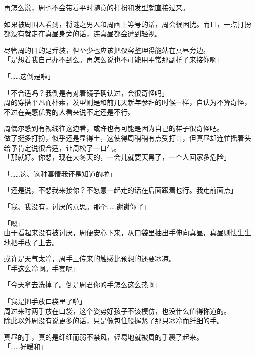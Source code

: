 再怎么说，周也不会带着平时随意的打扮和发型就直接过来。

如果被周围人看到，将谜之男人和周画上等号的话，周会很困扰。而且，一点打扮都没有就走在真昼身旁的话，连真昼都会遭到轻视。

尽管周的目的是乔装，但至少也应该把仪容整理得能站在真昼旁边。\\

「是想着我自己办不到么。再怎么说也不可能用平常那副样子来接你啊」

「……这倒是啦」

「不合适吗？我倒是有对着镜子确认过，会很奇怪吗」\\

周的穿搭平凡而朴素，发型则是和前几天新年参拜的时候一样，自认为不算奇怪，不过在美感优秀的人看来说不定还是不行。

周偶尔感到有视线往这边看，或许也有可能是因为自己的样子很奇怪吧。\\

做了挺多打扮，似乎还是显得土，这使得周稍稍有点受打击，但真昼却连忙摇着头给予肯定说很合适，让周松了一口气。\\

「那就好。你想，现在大冬天的，一会儿就要天黑了，一个人回家多危险」

「……这、这种事情我还是知道的啦」

「还是说，不想我来接你？不愿意一起走的话在后面跟着也行。我走前面点」

「我、我没有，讨厌的意思。那个……谢谢你了」

「嗯」\\

由于看起来没有被讨厌，周便安心下来，从口袋里抽出手伸向真昼，真昼则怯生生地把手放了上去。

或许是天气太冷，周手上传来的触感比预想的还要冰凉。\\

「手这么冷啊。手套呢」

「今天拿去洗掉了。倒是周君你的手怎么这么热啊」

「我是把手放口袋里了啦」\\

周过来时两手放在口袋，这个姿势好孩子不该模仿，也没什么值得称道的。\\

除此以外周没有说更多的话，只是像包住般握紧了那只冰冷而纤细的手。

真昼的手，真的是纤细而弱不禁风，轻易地就被周的手裹了起来。\\

「……好暖和」\\

